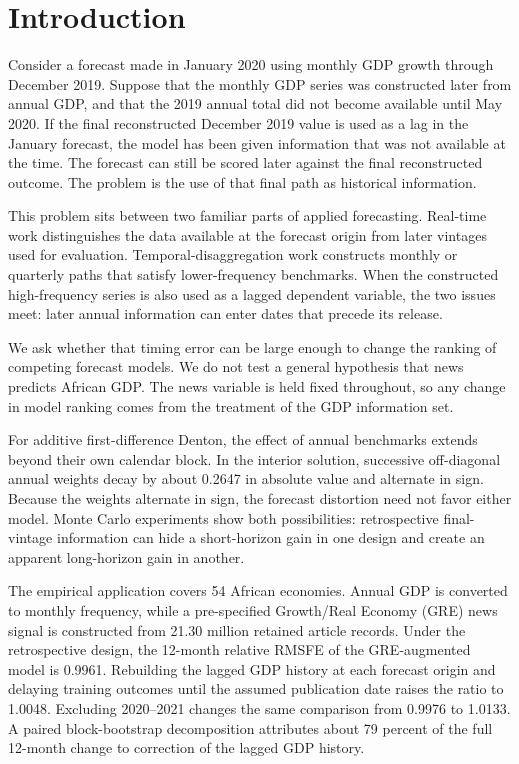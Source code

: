 \documentclass[preprint,12pt,authoryear]{elsarticle}
\begin{document}
\section{Introduction}

Consider a forecast made in January 2020 using monthly GDP growth through December 2019. Suppose that the monthly GDP series was constructed later from annual GDP, and that the 2019 annual total did not become available until May 2020. If the final reconstructed December 2019 value is used as a lag in the January forecast, the model has been given information that was not available at the time. The forecast can still be scored later against the final reconstructed outcome. The problem is the use of that final path as historical information.

This problem sits between two familiar parts of applied forecasting. Real-time work distinguishes the data available at the forecast origin from later vintages used for evaluation. Temporal-disaggregation work constructs monthly or quarterly paths that satisfy lower-frequency benchmarks. When the constructed high-frequency series is also used as a lagged dependent variable, the two issues meet: later annual information can enter dates that precede its release.

We ask whether that timing error can be large enough to change the ranking of competing forecast models. We do not test a general hypothesis that news predicts African GDP. The news variable is held fixed throughout, so any change in model ranking comes from the treatment of the GDP information set.

For additive first-difference Denton, the effect of annual benchmarks extends beyond their own calendar block. In the interior solution, successive off-diagonal annual weights decay by about 0.2647 in absolute value and alternate in sign. Because the weights alternate in sign, the forecast distortion need not favor either model. Monte Carlo experiments show both possibilities: retrospective final-vintage information can hide a short-horizon gain in one design and create an apparent long-horizon gain in another.

The empirical application covers 54 African economies. Annual GDP is converted to monthly frequency, while a pre-specified Growth/Real Economy (GRE) news signal is constructed from 21.30 million retained article records. Under the retrospective design, the 12-month relative RMSFE of the GRE-augmented model is 0.9961. Rebuilding the lagged GDP history at each forecast origin and delaying training outcomes until the assumed publication date raises the ratio to 1.0048. Excluding 2020--2021 changes the same comparison from 0.9976 to 1.0133. A paired block-bootstrap decomposition attributes about 79 percent of the full 12-month change to correction of the lagged GDP history.
\end{document}
